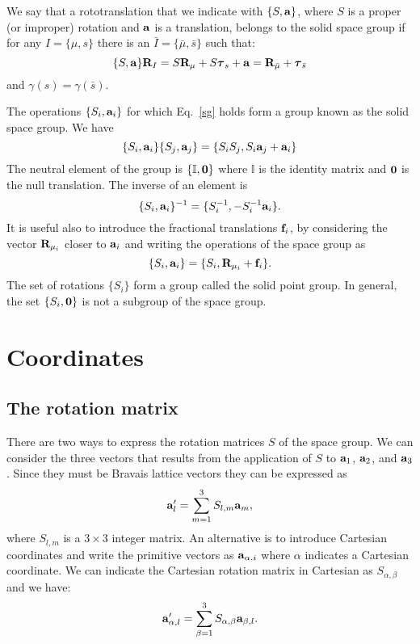 \documentclass[12pt,a4paper,twoside]{report}
\begin{document}
We say that a rototranslation that we indicate with $\{S,{\bf a}\}$, where
$S$ is a proper
(or improper) rotation and ${\bf a}$ is a translation, belongs to the solid
space group if for any $I=\{\mu,s\}$ there is an
$\bar I=\{\bar \mu,\bar s\}$ such that:
\begin{equation}
\{S,{\bf a}\} {\bf R}_I = S {\bf R}_\mu + S \boldsymbol{\tau}_s + {\bf a} =
{\bf R}_{\bar \mu} + \boldsymbol{\tau}_{\bar s}
\label{sg}
\end{equation}
and $\gamma(s)=\gamma(\bar s)$.

The operations $\{S_i,{\bf a}_i\}$ for which Eq.~\ref{sg} holds
form a group known as the solid space group.
We have
\begin{equation}
\{S_i,{\bf a}_i\} \{S_j,{\bf a}_j\} = \{S_i S_j,S_i {\bf a}_j + {\bf a}_i\}
\end{equation}
The neutral element of the group is $\{\mathbb{I},{\bf 0}\}$ where
$\mathbb{I}$ is the identity matrix and ${\bf 0}$ is the null translation.
The inverse of an element is
\begin{equation}
\{S_i,{\bf a}_i\}^{-1} = \{S_i^{-1}, -S_i^{-1} {\bf a}_i \}.
\end{equation}
It is useful also to introduce the fractional translations ${\bf f}_i$,
by considering the vector ${\bf R}_{\mu_i}$ closer to ${\bf a}_i$ and
writing the operations of the space group as
\begin{equation}
\{S_i,{\bf a}_i\}= \{S_i,{\bf R}_{\mu_i}+{\bf f}_i\}.
\end{equation}
The set of rotations $\{S_i\}$ form a group called the solid point group. In general, the
set $\{S_i,{\bf 0}\}$ is not a subgroup of the space group.

\section{Coordinates}

\subsection{The rotation matrix}

There are two ways to express the rotation matrices $S$ of the space
group. We can consider the three vectors that results from the application
of $S$ to ${\bf a}_1$, ${\bf a}_2$, and ${\bf a}_3$. Since they must
be Bravais lattice vectors they can be expressed as
\begin{equation}
{\bf a}'_l = \sum_{m=1}^3 S_{l,m} {\bf a}_m,
\label{scrys}
\end{equation}
where $S_{l,m}$ is a $3\times3$ integer matrix.
An alternative is to introduce Cartesian coordinates and write the primitive
vectors as ${\bf a}_{\alpha,i}$ where $\alpha$ indicates a Cartesian coordinate.
We can indicate the Cartesian rotation matrix in Cartesian as $S_{\alpha,\beta}$
and we have:
\begin{equation}
{\bf a}'_{\alpha,l} = \sum_{\beta=1}^3 S_{\alpha,\beta} {\bf a}_{\beta,l}.
\label{scart}
\end{equation}
\end{document}
